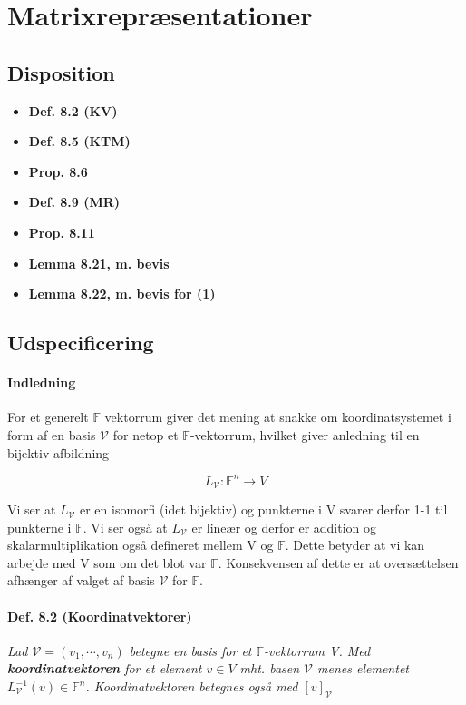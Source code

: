 \documentclass[paper=a4, fontsize=11pt]{scrartcl} %
\begin{document}
	\newpage
	
	\section{Matrixrepræsentationer}
	
	
	\subsection{Disposition}
	
	\begin{itemize}
		\item \textbf{Def. 8.2 (KV)}
		\item \textbf{Def. 8.5 (KTM)}
		\item \textbf{Prop. 8.6}
		\item \textbf{Def. 8.9 (MR)}
		\item \textbf{Prop. 8.11}
		\item \textbf{Lemma 8.21, m. bevis}
		\item \textbf{Lemma 8.22, m. bevis for (1)}
	\end{itemize}
	
	\subsection{Udspecificering}
	
	\paragraph{Indledning}
	
	
	
	
	For et generelt $\mathbb{F}$ vektorrum giver det mening at snakke om koordinatsystemet i form af en basis $\mathcal{V}$ for netop et $\mathbb{F}$-vektorrum, hvilket giver anledning til en bijektiv afbildning
	
	\[L_{\mathcal{V}} : \mathbb{F}^n \rightarrow V\]
	
	Vi ser at $L_{\mathcal{V}}$ er en isomorfi (idet bijektiv) og punkterne i V svarer derfor 1-1 til punkterne i $\mathbb{F}$. Vi ser også at $L_{\mathcal{V}}$ er lineær og derfor er addition og skalarmultiplikation også defineret mellem V og $\mathbb{F}$. Dette betyder at vi kan arbejde med V som om det blot var $\mathbb{F}$. Konsekvensen af dette er at oversættelsen afhænger af valget af basis $\mathcal{V}$ for $\mathbb{F}$.
	
	\paragraph{Def. 8.2 (Koordinatvektorer)}
	\textit{Lad $\mathcal{V} = (v_1,\cdots,v_n)$ betegne en basis for et $\mathbb{F}$-vektorrum V. Med \textbf{koordinatvektoren} for et element $v \in V$ mht. basen $\mathcal{V}$ menes elementet $L_{\mathcal{V}}^{-1}(v) \in \mathbb{F}^n$. Koordinatvektoren betegnes også med $[v]_{\mathcal{V}}$}
	
\end{document}
